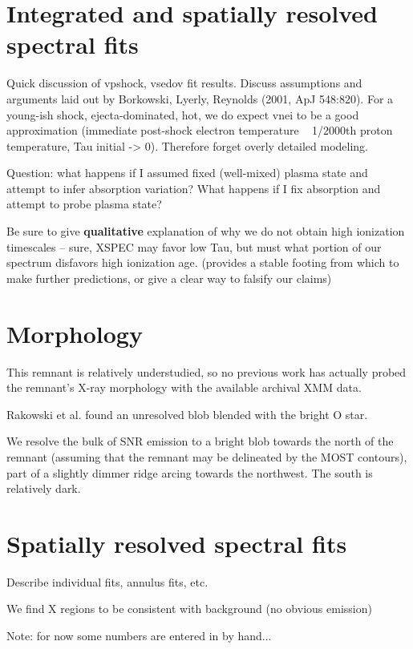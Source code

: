 \documentclass[preprint2,tighten,trackchanges]{aastex6}
\begin{document}
\section{Integrated and spatially resolved spectral fits} \label{sec:spec}

Quick discussion of vpshock, vsedov fit results.
Discuss assumptions and arguments laid out by Borkowski, Lyerly, Reynolds
(2001, ApJ 548:820).
For a young-ish shock, ejecta-dominated, hot, we do expect vnei to be a good
approximation (immediate post-shock electron temperature ~ 1/2000th proton
temperature, Tau initial -> 0).
Therefore forget overly detailed modeling.

Question:
what happens if I assumed fixed (well-mixed) plasma state and attempt to infer
absorption variation?
What happens if I fix absorption and attempt to probe plasma state?

Be sure to give \textbf{qualitative} explanation of why we do not obtain high
ionization timescales -- sure, XSPEC may favor low Tau, but must what portion
of our spectrum disfavors high ionization age. (provides a stable footing from
which to make further predictions, or give a clear way to falsify our claims)

\section{Morphology}

This remnant is relatively understudied, so no previous work has actually
probed the remnant's X-ray morphology with the available archival XMM data.

Rakowski et al. found an unresolved blob blended with the bright O star.

We resolve the bulk of SNR emission to a bright blob towards the north of the
remnant (assuming that the remnant may be delineated by the MOST contours),
part of a slightly dimmer ridge arcing towards the northwest.
The south is relatively dark.

\section{Spatially resolved spectral fits}

Describe individual fits, annulus fits, etc.

We find X regions to be consistent with background (no obvious emission)

Note: for now some numbers are entered in by hand...
\end{document}
